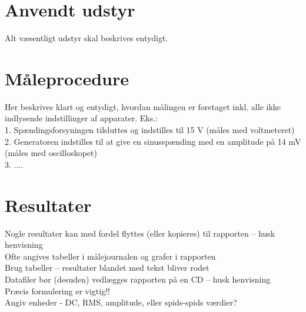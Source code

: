 \section{Anvendt udstyr}
\label{mic_output_anvendtudstyr}
Alt væsentligt udstyr skal beskrives entydigt.\\

\section{Måleprocedure}
\label{mic_output_maaleprocedure}
Her beskrives klart og entydigt, hvordan målingen er foretaget inkl. alle ikke indlysende indstillinger af apparater. Eks.: \\
1. Spændingsforsyningen tilsluttes og indstilles til 15 V (måles med voltmeteret) \\
2. Generatoren indstilles til at give en sinusspænding med en amplitude på 14 mV (måles med oscilloskopet) \\
3. ....\\

\section{Resultater}
\label{mic_output_resultater}
Nogle resultater kan med fordel flyttes (eller kopieres) til rapporten – husk henvisning \\
Ofte angives tabeller i målejournalen og grafer i rapporten \\
Brug tabeller – resultater blandet med tekst bliver rodet\\
Datafiler bør (desuden) vedlægges rapporten på en CD – husk henvisning\\
Præcis formulering er vigtig!!\\
Angiv enheder - DC, RMS, amplitude, eller spids-spids værdier?\\

